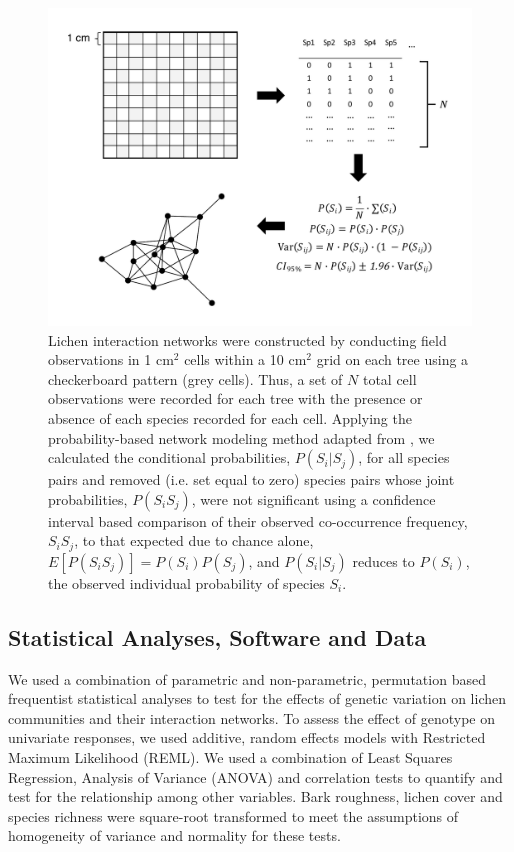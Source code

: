 \documentclass[11pt,twocolumn,twoside,lineno]{pnas-new}
\begin{document}
{\begin{figure}[ht]
\centering
\includegraphics[width=\linewidth]{lcn_araujo_method.pdf}
\caption{Lichen interaction networks were constructed by conducting
  field observations in 1 cm$^2$ cells within a 10 cm$^2$ grid on each
  tree using a checkerboard pattern (grey cells). Thus, a set of $N$
  total cell observations were recorded for each tree with the
  presence or absence of each species recorded for each cell. Applying
  the probability-based network modeling method adapted from
  \cite{Araujo2011}, we calculated the conditional probabilities,
  $P(S_i|S_j)$, for all species pairs and removed (i.e. set equal to
  zero) species pairs whose joint probabilities, $P(S_i S_j)$, were
  not significant using a confidence interval based comparison of
  their observed co-occurrence frequency, $S_iS_j$, to that expected
  due to chance alone, $E[P(S_iS_j)] = P(S_i) P(S_j)$, and
  $P(S_i|S_j)$ reduces to $P(S_i)$, the observed individual
  probability of species $S_i$.}
\label{fig:conet_method}
\end{figure}



\subsection*{Statistical Analyses, Software and Data}

We used a combination of parametric and non-parametric, permutation
based frequentist statistical analyses to test for the effects of
genetic variation on lichen communities and their interaction
networks. To assess the effect of genotype on univariate responses, we
used additive, random effects models with Restricted Maximum
Likelihood (REML). We used a combination of Least Squares Regression,
Analysis of Variance (ANOVA) and correlation tests to quantify and
test for the relationship among other variables. Bark roughness,
lichen cover and species richness were square-root transformed to meet
the assumptions of homogeneity of variance and normality for these
tests.

}
\end{document}
